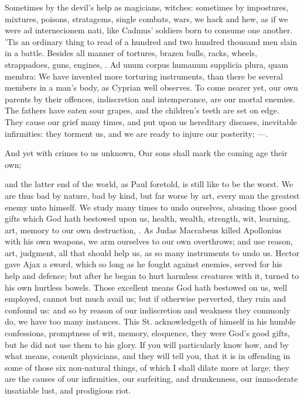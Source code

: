 {Sometimes by the devil's help as magicians, witches: sometimes by
impostures, mixtures, poisons, stratagems, single combats, wars, we
hack and hew, as if we were ad internecionem nati, like Cadmus'
soldiers born to consume one another. 'Tis an ordinary thing to read of
a hundred and two hundred thousand men slain in a battle. Besides all
manner of tortures, brazen bulls, racks, wheels, strappadoes, guns,
engines, \etc{}. Ad unum corpus humanum supplicia plura, quam membra:
We have invented more torturing instruments, than there be several
members in a man's body, as Cyprian well observes. To come nearer yet,
our own parents by their offences, indiscretion and intemperance, are
our mortal enemies. The fathers have eaten sour grapes, and the
children's teeth are set on edge. They cause our grief many times, and
put upon us hereditary diseases, inevitable infirmities: they torment
us, and we are ready to injure our posterity;
---.

And yet with crimes to us unknown,
Our sons shall mark the coming age their own;

and the latter end of the world, as Paul foretold, is still like
to be the worst. We are thus bad by nature, bad by kind, but far worse
by art, every man the greatest enemy unto himself. We study many times
to undo ourselves, abusing those good gifts which God hath bestowed
upon us, health, wealth, strength, wit, learning, art, memory to our
own destruction, . As Judas Maccabeus
killed Apollonius with his own weapons, we arm ourselves to our own
overthrows; and use reason, art, judgment, all that should help us, as
so many instruments to undo us. Hector gave Ajax a sword, which so long
as he fought against enemies, served for his help and defence; but
after he began to hurt harmless creatures with it, turned to his own
hurtless bowels. Those excellent means God hath bestowed on us, well
employed, cannot but much avail us; but if otherwise perverted, they
ruin and confound us: and so by reason of our indiscretion and weakness
they commonly do, we have too many instances. This St. \Austin{}
acknowledgeth of himself in his humble confessions, promptness of wit,
memory, eloquence, they were God's good gifts, but he did not use them
to his glory. If you will particularly know how, and by what means,
consult physicians, and they will tell you, that it is in offending in
some of those six non-natural things, of which I shall dilate more
at large; they are the causes of our infirmities, our surfeiting, and
drunkenness, our immoderate insatiable lust, and prodigious riot.

}

